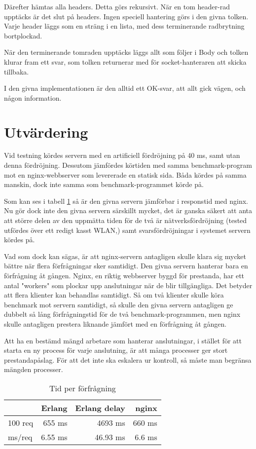 \documentclass[a4paper, 11pt]{article}
\begin{document}
Därefter hämtas alla headers. Detta görs rekursivt. När en tom header-rad upptäcks är det slut på headers. Ingen speciell hantering görs
i den givna tolken. Varje header läggs som en sträng i en lista, med dess terminerande radbrytning bortplockad.

När den terminerande tomraden upptäcks läggs allt som följer i Body och tolken klurar fram ett svar, som tolken returnerar med för socket-hanteraren att
skicka tillbaka.

I den givna implementationen är den alltid ett OK-svar, att allt gick vägen, och någon information.


\section{Utvärdering}

Vid testning kördes servern med en artificiell fördröjning på 40 ms, samt utan denna fördröjning.
Dessutom jämfördes körtiden med samma benchmark-program mot en nginx-webbserver som levererade en statisk sida. Båda kördes på
samma manskin, dock inte samma som benchmark-programmet körde på.

Som kan ses i tabell \ref{tab:results} så är den givna servern jämförbar i responstid med nginx. Nu gör dock inte
den givna servern särskillt mycket, det är ganska säkert att anta att större delen av den uppmätta tiden för de två är
nätverksfördröjning (tested utfördes över ett redigt kasst WLAN,) samt svarsfördröjningar i systemet servern kördes på.

Vad som dock kan sägas, är att nginx-servern antagligen skulle klara sig mycket bättre när flera förfrågningar sker samtidigt.
Den givna servern hanterar bara en förfrågning åt gången. Nginx, en riktig webbserver byggd för prestanda, har ett antal "workers"
som plockar upp anslutningar när de blir tillgängliga. Det betyder att flera klienter kan behandlas samtidigt. Så om två klienter
skulle köra benchmark mot servern samtidigt, så skulle den givna servern antagligen ge dubbelt så lång förfrågningstid för de två
benchmark-programmen, men nginx skulle antagligen prestera liknande jämfört med en förfrågning åt gången.

Att ha en bestämd mängd arbetare som hanterar anslutningar, i stället för att starta en ny process för varje anslutning,
är att många processer ger stort prestandapåslag. För att det inte ska eskalera ur kontroll, så måste man begränsa
mängden processer.

\begin{table}[h]
\centering
\begin{tabular}{|l|r|r|r|}
\hline
& Erlang & Erlang delay & nginx \\
\hline
100 req & 655 ms & 4693 ms & 660 ms \\
\hline
ms/req & 6.55 ms & 46.93 ms & 6.6 ms \\
\hline
\end{tabular}
\caption{Tid per förfrågning}
\label{tab:results}
\end{table}
\end{document}

